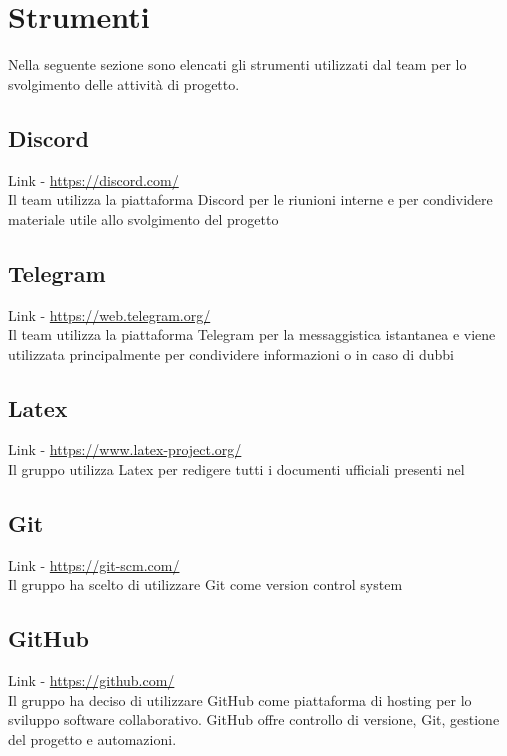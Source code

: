 \section{Strumenti}
\label{sec:strumenti}

Nella seguente sezione sono elencati gli strumenti utilizzati dal team per lo svolgimento delle attività di progetto.

\subsection{Discord}
\label{subsection:discord}
Link - \href{https://discord.com/}{https://discord.com/} \\
Il team utilizza la piattaforma Discord per le riunioni interne e per condividere materiale utile allo svolgimento del progetto

\subsection{Telegram}
\label{subsection:telegram}
Link - \href{https://web.telegram.org/}{https://web.telegram.org/} \\
Il team utilizza la piattaforma Telegram per la messaggistica istantanea e viene utilizzata principalmente 
per condividere informazioni o in caso di dubbi 

\subsection{Latex}
\label{subsection:latex}
Link - \href{https://www.latex-project.org/}{https://www.latex-project.org/} \\
Il gruppo utilizza Latex per redigere tutti i documenti ufficiali presenti nel  

\subsection{Git}
\label{subsection:git}
Link - \href{https://git-scm.com/}{https://git-scm.com/} \\
Il gruppo ha scelto di utilizzare Git come version control system

\subsection{GitHub}
\label{subsection:github}
Link - \href{https://github.com/}{https://github.com/} \\
Il gruppo ha deciso di utilizzare GitHub come piattaforma di hosting per lo sviluppo software collaborativo. GitHub
offre controllo di versione,  Git, gestione del progetto e automazioni.

